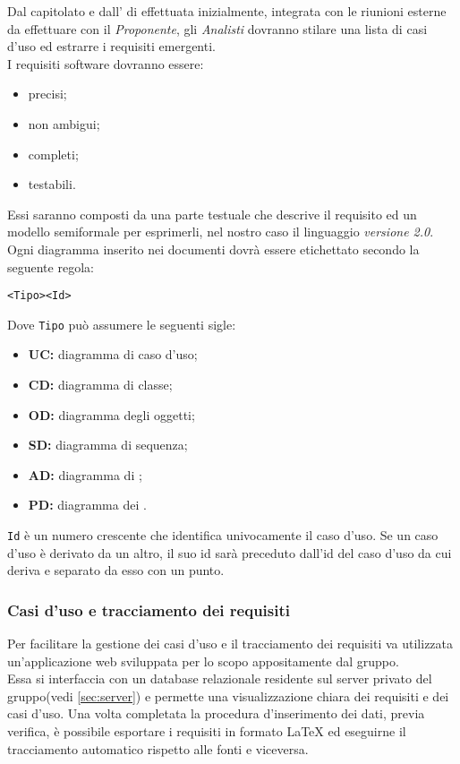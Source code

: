\documentclass{scalatekids-article}
\begin{document}
Dal capitolato e dall' di  effettuata
inizialmente, integrata con le riunioni esterne da effettuare con il
\textit{Proponente}, gli \textit{Analisti} dovranno stilare una lista di casi
d'uso ed estrarre i requisiti emergenti.\\
I requisiti software dovranno essere:
\begin{itemize}
    \item precisi;
    \item non ambigui;
    \item completi;
    \item testabili.
\end{itemize}
Essi saranno composti da una parte testuale che descrive il requisito ed un
modello semiformale per esprimerli, nel nostro caso il linguaggio 
\textit{versione 2.0}. Ogni diagramma inserito nei documenti dovrà essere
etichettato secondo la seguente regola:
\begin{center}
    \verb=<Tipo><Id>=
\end{center}
Dove \verb=Tipo= può assumere le seguenti sigle:
\begin{itemize}
    \item\textbf{UC:} diagramma di caso d'uso;
    \item\textbf{CD:} diagramma di classe;
    \item\textbf{OD:} diagramma degli oggetti;
    \item\textbf{SD:} diagramma di sequenza;
    \item\textbf{AD:} diagramma di ;
    \item\textbf{PD:} diagramma dei .
\end{itemize}
\verb=Id= è un numero crescente che identifica
univocamente il caso d'uso. Se un caso d'uso è derivato da un altro, il suo id
sarà preceduto dall'id del caso d'uso da cui deriva e separato da esso con un
punto.

\subsubsection{Casi d'uso e tracciamento dei requisiti}

\label{sec:front-end}
Per facilitare la gestione dei casi d'uso e il tracciamento dei requisiti
va utilizzata un'applicazione web sviluppata per lo scopo appositamente dal
gruppo.\\Essa si interfaccia con un database relazionale residente sul server
privato del gruppo(vedi \ref{sec:server}) e permette una visualizzazione chiara dei
requisiti e dei casi d'uso. Una volta completata la procedura d'inserimento dei
dati, previa verifica, è possibile esportare i requisiti in formato
\LaTeX\xspace ed eseguirne il tracciamento automatico rispetto alle
fonti e viceversa.
\end{document}
